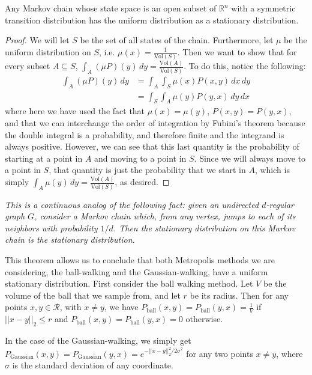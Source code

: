 \documentclass[11pt]{article}
\begin{document}
\begin{theorem}
Any Markov chain whose state space is an open subset of $\mathbb{R}^n$ with a symmetric transition distribution has the uniform distribution as a stationary distribution.
\label{symmetric}
\end{theorem}
\begin{proof}
We will let $S$ be the set of all states of the chain. Furthermore, let $\mu$ be the uniform distribution on $S$, i.e. $\mu(x) = \frac{1}{\text{Vol}(S)}$. Then we want to show that for every subset $A \subseteq S$, $\int_A (\mu P)(y)\, dy = \frac{\text{Vol}(A)}{\text{Vol}(S)}$. To do this, notice the following:
\begin{align*}
\int_A (\mu P)(y)\, dy &= \int_A \int_S \mu(x)P(x,y)\, dx\, dy \\
&= \int_S \int_A \mu(y)P(y,x)\, dy\, dx
\end{align*}
where here we have used the fact that $\mu(x) = \mu(y)$, $P(x,y) = P(y,x)$, and that we can interchange the order of integration by Fubini's theorem because the double integral is a probability, and therefore finite and the integrand is always positive. However, we can see that this last quantity is the probability of starting at a point in $A$ and moving to a point in $S$. Since we will always move to a point in $S$, that quantity is just the probability that we start in $A$, which is simply $\int_A \mu(y)\, dy = \frac{\text{Vol}(A)}{\text{Vol}(S)}$, as desired.
\end{proof}
\begin{remark} 
\emph{This is a continuous analog of the following fact: given an undirected $d$-regular graph $G$, consider a Markov chain which, from any vertex, jumps to each of its neighbors with probability $1/d$. Then the stationary distribution on this Markov chain is the stationary distribution.}
\end{remark}

This theorem allows us to conclude that both Metropolis methods we are considering, the ball-walking and the Gaussian-walking, have a uniform stationary distribution. First consider the ball walking method. Let $V$ be the volume of the ball that we sample from, and let $r$ be its radius. Then for any points $x,y\in\mathcal{R}$, with $x\ne y$, we have $P_\text{ball}(x,y) = P_\text{ball}(y,x) = \frac{1}{V}$ if $||x-y||_2 \le r$ and $P_\text{ball}(x,y) = P_\text{ball}(y,x) = 0$ otherwise.

In the case of the Gaussian-walking, we simply get $P_\text{Gaussian}(x,y) = P_\text{Gaussian}(y,x) = e^{-||x-y||_2^2 / 2\sigma^2}$ for any two points $x\ne y$, where $\sigma$ is the standard deviation of any coordinate.
\end{document}
